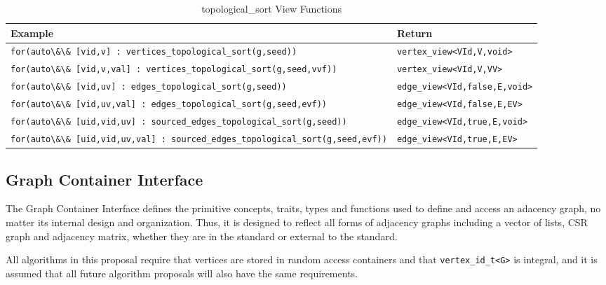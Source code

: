 \documentclass[10pt,onecolumn]{article}
\newcommand{\tcode}[1]{\lstinline[breaklines=true]{#1}}
\begin{document}
\begin{table}[h!]
\begin{center}
\resizebox{\textwidth}{!}
{\begin{tabular}{l l}
\hline
    \textbf{Example} & \textbf{Return} \\
\hline
    \tcode{for(auto\&\& [vid,v] : vertices_topological_sort(g,seed))} & \tcode{vertex_view<VId,V,void>} \\
    \tcode{for(auto\&\& [vid,v,val] : vertices_topological_sort(g,seed,vvf))} & \tcode{vertex_view<VId,V,VV>} \\
\hline
    \tcode{for(auto\&\& [vid,uv] : edges_topological_sort(g,seed))} & \tcode{edge_view<VId,false,E,void>} \\
    \tcode{for(auto\&\& [vid,uv,val] : edges_topological_sort(g,seed,evf))} & \tcode{edge_view<VId,false,E,EV>} \\
\hline
    \tcode{for(auto\&\& [uid,vid,uv] : sourced_edges_topological_sort(g,seed))} & \tcode{edge_view<VId,true,E,void>} \\
    \tcode{for(auto\&\& [uid,vid,uv,val] : sourced_edges_topological_sort(g,seed,evf))} & \tcode{edge_view<VId,true,E,EV>} \\
\hline
\end{tabular}}
\caption{topological\_sort View Functions}
\label{tab:topo_sort}
\end{center}
\end{table}

\subsection{Graph Container Interface}
The Graph Container Interface defines the primitive concepts, traits, types and functions used to define and access an adacency graph, no matter its internal design and organization. Thus, it is designed to reflect all forms of adjacency graphs including a vector of lists, CSR graph and adjacency matrix, whether they are in the standard or external to the standard.

All algorithms in this proposal require that vertices are stored in random access containers and that \tcode{vertex_id_t<G>} is integral, and it is assumed that all future algorithm proposals will also have the same requirements. 
\end{document}
